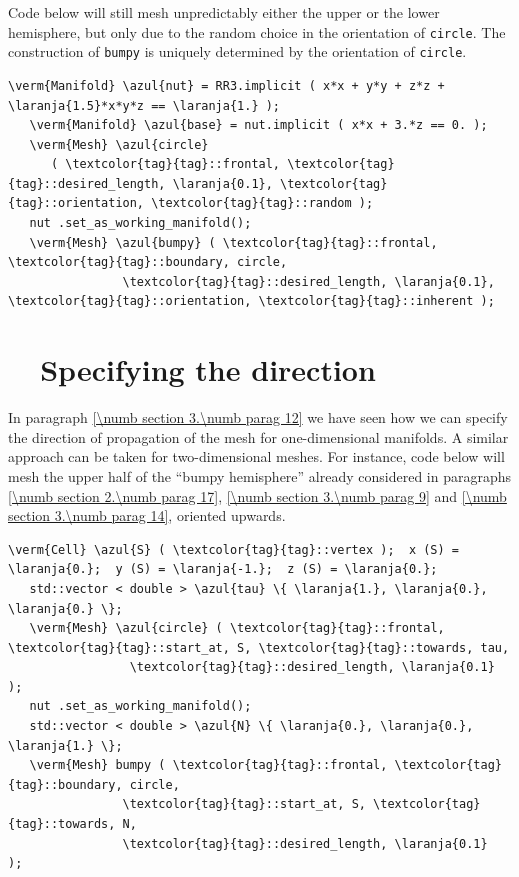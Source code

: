 Code below will still mesh unpredictably either the upper or the lower
hemisphere, but only due to the random choice in the orientation of {\small\tt circle}.
The construction of {\small\tt bumpy} is uniquely determined by the orientation of
{\small\tt circle}.

\begin{Verbatim}[commandchars=\\\{\},formatcom=\small\tt,
   baselinestretch=0.94,framesep=2mm                      ]
   \verm{Manifold} \azul{nut} = RR3.implicit ( x*x + y*y + z*z + \laranja{1.5}*x*y*z == \laranja{1.} );
   \verm{Manifold} \azul{base} = nut.implicit ( x*x + 3.*z == 0. );
   \verm{Mesh} \azul{circle}
      ( \textcolor{tag}{tag}::frontal, \textcolor{tag}{tag}::desired_length, \laranja{0.1}, \textcolor{tag}{tag}::orientation, \textcolor{tag}{tag}::random );
   nut .set_as_working_manifold();
   \verm{Mesh} \azul{bumpy} ( \textcolor{tag}{tag}::frontal, \textcolor{tag}{tag}::boundary, circle,
                \textcolor{tag}{tag}::desired_length, \laranja{0.1}, \textcolor{tag}{tag}::orientation, \textcolor{tag}{tag}::inherent );
\end{Verbatim}


\section{~~Specifying the direction}\label{\numb section 3.\numb parag 15}

In paragraph \ref{\numb section 3.\numb parag 12} we have seen how we can specify the direction
of propagation of the mesh for one-dimensional manifolds.
A similar approach can be taken for two-dimensional meshes.
For instance, code below will mesh the upper half of the ``bumpy hemisphere'' already considered
in paragraphs \ref{\numb section 2.\numb parag 17}, \ref{\numb section 3.\numb parag 9} and
\ref{\numb section 3.\numb parag 14}, oriented upwards.

\begin{Verbatim}[commandchars=\\\{\},formatcom=\small\tt,frame=single,
   label=parag-\ref{\numb section 3.\numb parag 15}.cpp,rulecolor=\color{moldura},
   baselinestretch=0.94,framesep=2mm                                            ]
   \verm{Cell} \azul{S} ( \textcolor{tag}{tag}::vertex );  x (S) = \laranja{0.};  y (S) = \laranja{-1.};  z (S) = \laranja{0.};
   std::vector < double > \azul{tau} \{ \laranja{1.}, \laranja{0.}, \laranja{0.} \};
   \verm{Mesh} \azul{circle} ( \textcolor{tag}{tag}::frontal, \textcolor{tag}{tag}::start_at, S, \textcolor{tag}{tag}::towards, tau,
                 \textcolor{tag}{tag}::desired_length, \laranja{0.1}                          );
   nut .set_as_working_manifold();
   std::vector < double > \azul{N} \{ \laranja{0.}, \laranja{0.}, \laranja{1.} \};
   \verm{Mesh} bumpy ( \textcolor{tag}{tag}::frontal, \textcolor{tag}{tag}::boundary, circle,
                \textcolor{tag}{tag}::start_at, S, \textcolor{tag}{tag}::towards, N,
                \textcolor{tag}{tag}::desired_length, \laranja{0.1}            );
\end{Verbatim}


